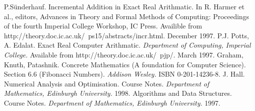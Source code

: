 \documentclass{cs4rep}
\begin{document}
\begin{thebibliography}{20}
 P.S\"{u}nderhauf. Incremental Addition in Exact Real Arithmatic. In R. Harmer et al., editors, Advances in Theory and Formal Methods of Computing: Proceedings of the fourth Imperial College Workshop, IC Press. Availible from http://theory.doc.ic.ac.uk/~ps15/abstracts/incr.html. December 1997.
 P.J. Potts, A. Edalat. Exact Real Computer Arithmatic. {\em Department of Computing, Imperial College.} Available from http://theory.doc.ic.ac.uk/~pjp/. March 1997.
 Graham, Knuth, Patashnik. Concrete Mathematics (A foundation for Computer Science). Section 6.6 (Fibonacci Numbers). {\em Addison Wesley.} ISBN 0-201-14236-8.
 J. Hall. Numerical Analysis and Optimisation. Course Notes. {\em Department of Mathematics, Edinburgh University.} 1998.
 Algorithms and Data Structures. Course Notes. {\em Department of Mathematics, Edinburgh University.} 1997.
\end{thebibliography}
\end{document}
